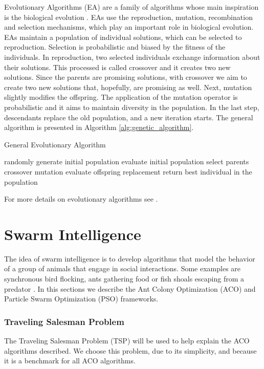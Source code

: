 			Evolutionary Algorithms (EA) are a family of algorithms whose main inspiration is the biological evolution \cite{eiben03}. EAs use the reproduction, mutation, recombination and selection mechanisms, which play an important role in biological evolution.	
			EAs maintain a population of individual solutions, which can be selected to reproduction. Selection is probabilistic and biased by the fitness of the individuals. In reproduction, two selected individuals exchange information about their solutions. This processed is called crossover and it creates two new solutions. Since the parents are promising solutions, with crossover we aim to create two new solutions that, hopefully, are promising as well. 
			Next, mutation slightly modifies the offspring. The application of the mutation operator is probabilistic and it aims to maintain diversity in the population.
			In the last step, descendants replace the old population, and a new iteration starts.
			The general algorithm is presented in Algorithm \ref{alg:genetic_algorithm}.
			\begin{algorithm}
				\caption{General Evolutionary Algorithm}
				\label{alg:genetic_algorithm}
				\begin{algorithmic}
				\STATE randomly generate initial population
				\STATE evaluate initial population
					\STATE select parents
					\STATE crossover
					\STATE mutation
					\STATE evaluate offspring
					\STATE replacement
				\ENDWHILE
				\STATE return best individual in the population
				\end{algorithmic}
			\end{algorithm} 
			
			For more details on evolutionary algorithms see \cite{eiben03}.
			
		\section{Swarm Intelligence}
		\label{subsec:swarm_intelligence}
		The idea of swarm intelligence is to develop algorithms that model the behavior of a group of animals that engage in social interactions. Some examples are synchronous bird flocking, ants gathering food or fish shoals escaping from a predator \cite{si01}. In this sections we describe the Ant Colony Optimization (ACO) and Particle Swarm Optimization (PSO) frameworks.
		
		\subsubsection*{Traveling Salesman Problem}
		 The Traveling Salesman Problem (TSP) will be used to help explain the ACO algorithms described. We choose this problem, due to its simplicity, and because it is a benchmark for all ACO algorithms.
		
